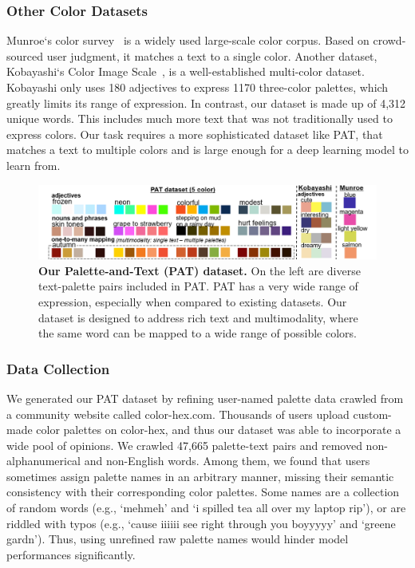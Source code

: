 \documentclass[runningheads]{llncs}
\begin{document}
\subsubsection{Other Color Datasets} 
Munroe`s color survey~\cite{munroe2010color} is a widely used large-scale color corpus. Based on crowd-sourced user judgment, it matches a text to a single color. Another dataset, Kobayashi`s Color Image Scale~\cite{kobayashi2009color}, is a well-established multi-color dataset. Kobayashi only uses 180 adjectives to express 1170 three-color palettes, which greatly limits its range of expression. In contrast, our dataset is made up of 4,312 unique words. This includes much more text that was not traditionally used to express colors. Our task requires a more sophisticated dataset like PAT, that matches a text to multiple colors and is large enough for a deep learning model to learn from.
\begin{figure}[t]
\centering
\includegraphics[width=\textwidth]{./dataset_figure.png}
\caption{\textbf{Our Palette-and-Text (PAT) dataset.}  On the left are diverse text-palette pairs included in PAT. PAT has a very wide range of expression, especially when compared to existing datasets. Our dataset is designed to address rich text and multimodality, where the same word can be mapped to a wide range of possible colors.}\label{fig:dataset_examples}
\end{figure}
\subsubsection{Data Collection} 
We generated our PAT dataset by refining user-named palette data crawled from a community website called color-hex.com. Thousands of users upload custom-made color palettes on color-hex, and thus our dataset was able to incorporate a wide pool of opinions. We crawled 47,665 palette-text pairs and removed non-alphanumerical and non-English words. Among them, we found that users sometimes assign palette names in an arbitrary manner, missing their semantic consistency with their corresponding color palettes. Some names are a collection of random words (e.g., `mehmeh' and 
`i spilled tea all over my laptop rip'), or are riddled with typos (e.g., `cause iiiiii see right through you boyyyyy' and `greene gardn'). Thus, using unrefined raw palette names would hinder model performances significantly. 
\end{document}
